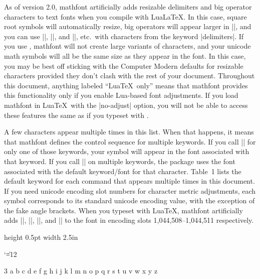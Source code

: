 \documentclass[12pt,twoside]{article}
\begin{document}
As of version 2.0, \textsf{mathfont} artificially adds resizable delimiters and big operator characters to text fonts when you compile with Lua\LaTeX. In this case, square root symbols will automatically resize, big operators will appear larger in |\displaystyle|, and you can use |\left|, |\right|, and |\big|, etc.\ with characters from the keyword |delimiters|. If you use \XeTeX, \textsf{mathfont} will not create large variants of characters, and your unicode math symbols will all be the same size as they appear in the font. In this case, you may be best off sticking with the Computer Modern defaults for resizable characters provided they don't clash with the rest of your document. Throughout this document, anything labeled ``Lua\TeX\ only'' means that \textsf{mathfont} provides this functionality only if you enable Lua-based font adjustments. If you load \textsf{mathfont} in Lua\TeX\ with the |no-adjust| option, you will not be able to access these features the same as if you typeset with \XeTeX.

A few characters appear multiple times in this list. When that happens, it means that \textsf{mathfont} defines the control sequence for multiple keywords. If you call |\mathfont| for only one of those keywords, your symbol will appear in the font associated with that keyword. If you call |\mathfont| on multiple keywords, the package uses the font associated with the default keyword/font for that character. Table~1 lists the default keyword for each command that appears multiple times in this document. If you need unicode encoding slot numbers for character metric adjustments, each symbol corresponds to its standard unicode encoding value, with the exception of the fake angle brackets. When you typeset with Lua\TeX, \textsf{mathfont} artificially adds |\fakelangle|, |\fakerangle|, |\fakellangle|, and |\fakerrangle| to the font in encoding slots 1,044,508--1,044,511 respectively.

\bigskip\bigskip
\nointerlineskip\centerline{\vrule height 0.5pt width 2.5in}
\bigskip\bigskip

\catcode`\|=12


\begin{multicols}{3}
\charexample a
\charexample b
\charexample c
\charexample d
\charexample e
\charexample f
\charexample g
\charexample h
\charexample i
\charexample j
\charexample k
\charexample l
\charexample m
\charexample n
\charexample o
\charexample p
\charexample q
\charexample r
\charexample s
\charexample t
\charexample u
\charexample v
\charexample w
\charexample x
\charexample y
\charexample z
\charexample\hbar
\charexample\imath
\charexample\jmath
\end{multicols}
\end{document}
